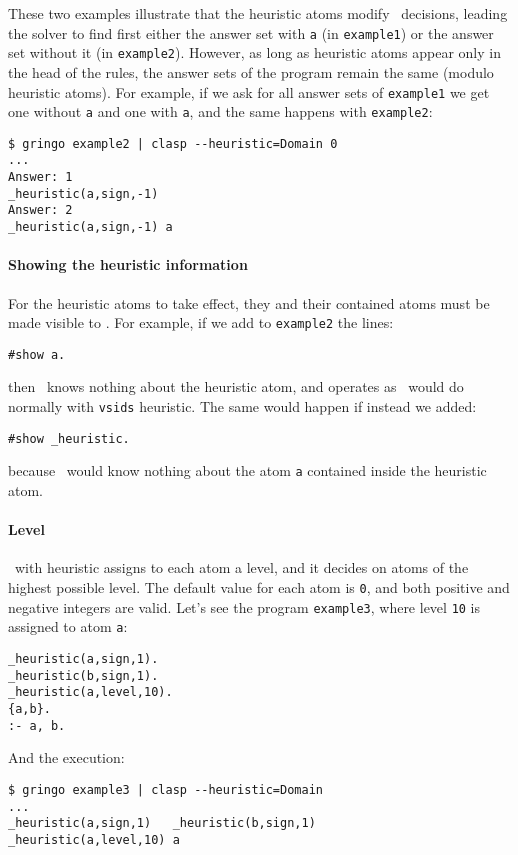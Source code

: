 These two examples illustrate that the heuristic atoms modify \clasp\ decisions,
leading the solver to find first either the answer set with \texttt{a} (in \texttt{example1}) or the answer set without it (in \texttt{example2}).
However, as long as heuristic atoms appear only in the head of the rules,
the answer sets of the program remain the same (modulo heuristic atoms).
For example, if we ask for all answer sets of \texttt{example1}  we get one without \texttt{a} and one with \texttt{a},
and the same happens with \texttt{example2}:
\begin{lstlisting}[numbers=none]
$ gringo example2 | clasp --heuristic=Domain 0
...
Answer: 1
_heuristic(a,sign,-1)
Answer: 2
_heuristic(a,sign,-1) a
\end{lstlisting}

\paragraph{Showing the heuristic information}

For the heuristic atoms to take effect, they and their contained atoms must be  made visible to \clasp. For example, if we add to \texttt{example2} the lines:
\begin{lstlisting}[numbers=none]
#show a.
\end{lstlisting}
then \clasp\ knows nothing about the heuristic atom, and operates as \clasp\ would do normally with \texttt{vsids} heuristic. The same would happen if instead we added:
\begin{lstlisting}[numbers=none]
#show _heuristic.
\end{lstlisting}
 because \clasp\ would know nothing about the atom \texttt{a} contained inside the heuristic atom.

\paragraph{Level}
\clasp\ with heuristic  assigns to each atom a level, and it decides on atoms of the highest possible level.
The default value for each atom is \texttt{0},  and both positive and negative integers are valid.
Let's see the program \texttt{example3}, where level \texttt{10} is assigned to atom \texttt{a}:
\begin{lstlisting}[numbers=none]
_heuristic(a,sign,1).
_heuristic(b,sign,1).
_heuristic(a,level,10).
{a,b}.
:- a, b.
\end{lstlisting}
And the execution:
\begin{lstlisting}[numbers=none]
$ gringo example3 | clasp --heuristic=Domain
...
_heuristic(a,sign,1)   _heuristic(b,sign,1)
_heuristic(a,level,10) a\end{lstlisting}

